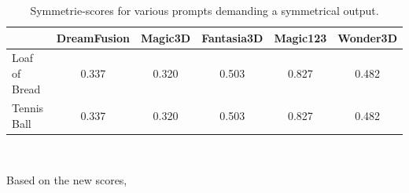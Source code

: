 \begin{table}[ht]
    \centering
    \small
    \begin{tabular}{lccccc}
    \toprule
    {} & DreamFusion & Magic3D & Fantasia3D & Magic123 & Wonder3D \\
    \midrule
    Loaf of Bread & 0.337 & 0.320 & 0.503 & 0.827 & 0.482 \\
    Tennis Ball & 0.337 & 0.320 & 0.503 & 0.827 & 0.482 \\
    \bottomrule
    \end{tabular}
    \caption{Symmetrie-scores for various prompts demanding a symmetrical output.}~\label{table:symmetryScores}
\end{table}

Based on the new scores, 



